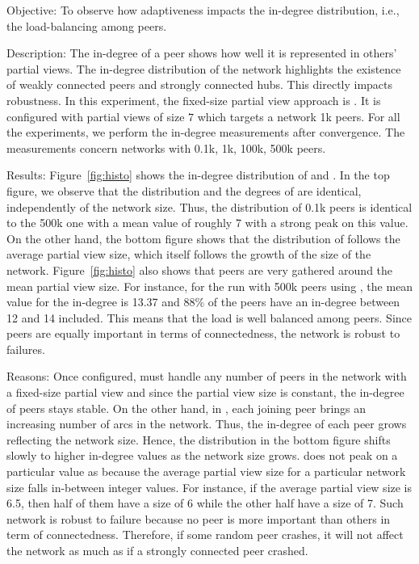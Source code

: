 \begin{asparadesc}
\item[Objective:] To observe how adaptiveness impacts the in-degree
  distribution, i.e., the load-balancing among peers.
\item[Description:] The in-degree of a peer shows how well it is
  represented in others' partial views. The in-degree distribution of
  the network highlights the existence of weakly connected peers and
  strongly connected hubs. This directly impacts robustness. In this
  experiment, the fixed-size partial view approach is \CYCLON{}. It is
  configured with partial views of size $7$ which targets a network 1k
  peers.  For all the experiments, we perform the in-degree
  measurements after convergence. The measurements concern networks
  with 0.1k, 1k, 100k, 500k peers.
\item[Results:] Figure~\ref{fig:histo} shows the in-degree
  distribution of \CYCLON and \SPRAY. In the top figure, we observe
  that the distribution and the degrees of \CYCLON are identical,
  independently of the network size. Thus, the distribution of 0.1k
  peers is identical to the 500k one with a mean value of roughly 7
  with a strong peak on this value. On the other hand, the bottom
  figure shows that the distribution of \SPRAY follows the average
  partial view size, which itself follows the growth of the size of
  the network. Figure~\ref{fig:histo} also shows that peers are very
  gathered around the mean partial view size. For instance, for the
  run with 500k peers using \SPRAY, the mean value for the in-degree
  is 13.37 and 88\% of the peers have an in-degree between 12 and 14
  included. This means that the load is well balanced among
  peers. Since peers are equally important in terms of connectedness,
  the network is robust to failures.
\item[Reasons:] Once configured, \CYCLON must handle any number of
  peers in the network with a fixed-size partial view and since the
  partial view size is constant, the in-degree of peers stays
  stable. 
  On the other hand, in \SPRAY, each joining peer brings an increasing
  number of arcs in the network. Thus, the in-degree of each peer
  grows reflecting the network size. Hence, the distribution in the
  bottom figure shifts slowly to higher in-degree values as the
  network size grows.  \SPRAY does not peak on a particular value as
  \CYCLON because the average partial view size for a particular
  network size falls in-between integer values. For instance, if the
  average partial view size is 6.5, then half of them have a size of 6
  while the other half have a size of 7. Such network is robust to
  failure because no peer is more important than others in term of
  connectedness. Therefore, if some random peer crashes, it will not
  affect the network as much as if a strongly connected peer crashed.
\end{asparadesc}

